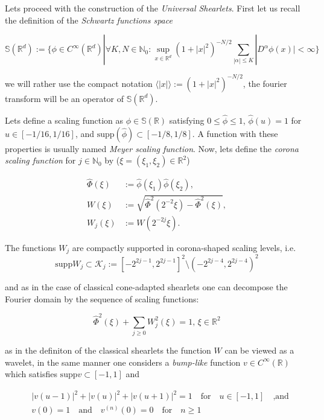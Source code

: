 \bigskip 

Lets proceed with the construction of the \textit{Universal Shearlets}. First let us recall the definition of the \textit{Schwartz functions space} 

$$
\mathbb{S}(\mathbb{R}^d):=\{\phi\in C^{\infty}(\mathbb{R}^d)|\forall K,N\in\mathbb{N}_0:\sup_{x\in\mathbb{R}^d}(1+|x|^2)^{-N/2}\sum_{|\alpha|\leq K}|D^{\alpha}\phi(x)|<\infty\}
$$

we will rather use the compact notation $\langle|x|\rangle:=(1+|x|^2)^{-N/2}$, the fourier transform will be an operator of $\mathbb{S}(\mathbb{R}^d)$. 

\bigskip

Lets define a scaling function as  $\phi\in\mathbb{S}(\mathbb{R})$ satisfying $0\leq \hat{\phi}\leq 1$, $\hat{\phi}(u)=1$ for $u\in [-1/16,1/16]$, and $\text{supp}(\hat{\phi})\subset [-1/8,1/8]$. A function with these properties is usually named \textit{Meyer scaling function}. Now, lets define the \textit{corona scaling function} for $j\in\mathbb{N}_0$ by ($\xi=(\xi_1,\xi_2)\in\mathbb{R}^2$)

$$
\begin{aligned}
\hat{\Phi}(\xi)&:=\hat{\phi}(\xi_1)\hat{\phi}(\xi_2),\\
W(\xi)&:= \sqrt{\hat{\Phi}^2(2^{-2}\xi)-\hat{\Phi}^2(\xi)},\\
W_j(\xi)&:=W(2^{-2j}\xi).
\end{aligned}
$$

The functions $W_j$ are compactly supported in corona-shaped scaling levels, i.e.\,
\begin{equation}
\label{eq:alpha31}
\text{supp}W_j\subset \mathcal{K}_j:=[-2^{2j-1},2^{2j-1}]^2\setminus (-2^{2j-4},2^{2j-4})^2
\end{equation}

and as in the case of classical cone-adapted shearlets one can decompose the Fourier domain by the sequence of scaling functions:

$$
\hat{\Phi}^2(\xi)+\sum_{j\geq 0} W^2_j(\xi)=1\text{,   }\xi\in\mathbb{R}^2
$$ 

as in the definiton of the classical shearlets the function $W$ can be viewed as a wavelet, in the same manner one considers a \textit{bump-like} function $v\in C^{\infty}(\mathbb{R})$ which satisfies $\text{supp}v\subset [-1,1]$ and 

\begin{align}
& |v(u-1)|^2+|v(u)|^2+|v(u+1)|^2 = 1 \quad \textrm{for} \quad u\in[-1,1] \quad \textrm{,and}\label{eq:alpha33}\\
& v(0)=1 \quad \textrm{and} \quad v^{(n)}(0)=0\quad\textrm{for}\quad n\geq 1\label{eq:alpha34}
\end{align}

